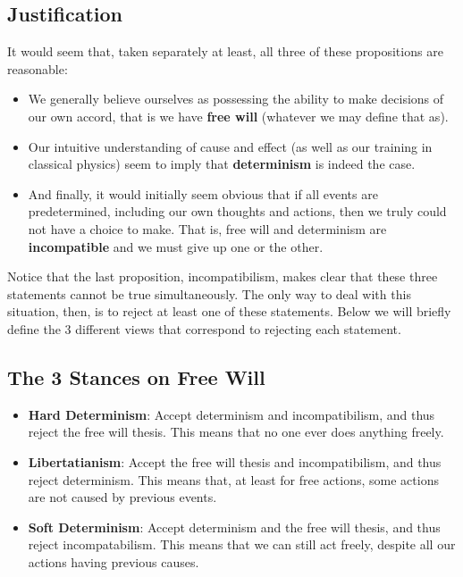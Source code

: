 \documentclass{article}
\begin{document}
\subsection{Justification}
It would seem that, taken separately at least, all three of these propositions are reasonable:
\begin{itemize}
  \item We generally believe ourselves as possessing the ability to make decisions of our own accord, that is we have \textbf{free will} (whatever we may define that as).
  \item Our intuitive understanding of cause and effect (as well as our training in classical physics) seem to imply that \textbf{determinism} is indeed the case.
  \item And finally, it would initially seem obvious that if all events are predetermined, including our own thoughts and actions, then we truly could not have a choice to make. That is, free will and determinism are \textbf{incompatible} and we must give up one or the other.
\end{itemize}

Notice that the last proposition, incompatibilism, makes clear that these three statements cannot be true simultaneously. The only way to deal with this situation, then, is to reject at least one of these statements. Below we will briefly define the 3 different views that correspond to rejecting each statement.

\subsection{The 3 Stances on Free Will}
\begin{itemize}
  \item \textbf{Hard Determinism}: Accept determinism and incompatibilism, and thus reject the free will thesis. This means that no one ever does anything freely.
  \item \textbf{Libertatianism}: Accept the free will thesis and incompatibilism, and thus reject determinism. This means that, at least for free actions, some actions are not caused by previous events.
  \item \textbf{Soft Determinism}: Accept determinism and the free will thesis, and thus reject incompatabilism. This means that we can still act freely, despite all our actions having previous causes.
\end{itemize}
\end{document}

